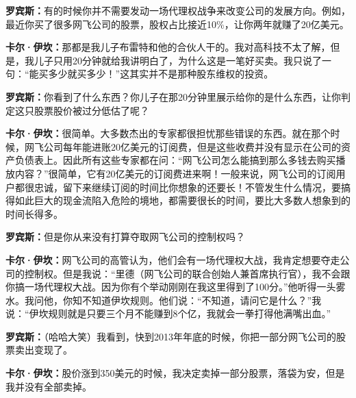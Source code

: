 \begin{BookQuote}
\textbf{罗宾斯：}有的时候你并不需要发动一场代理权战争来改变公司的发展方向。例如，最近你买了很多网飞公司的股票，股权占比接近10\%，让你两年就赚了20亿美元。
\end{BookQuote}

\begin{BookQuote}
\textbf{卡尔·伊坎：}那都是我儿子布雷特和他的合伙人干的。我对高科技不太了解，但是，我儿子只用20分钟就给我讲明白了，为什么这是一笔好买卖。我只说了一句：“能买多少就买多少！”这其实并不是那种股东维权的投资。
\end{BookQuote}

\begin{BookQuote}
\textbf{罗宾斯：}你看到了什么东西？你儿子在那20分钟里展示给你的是什么东西，让你判定这只股票股价被过分低估了呢？
\end{BookQuote}

\begin{BookQuote}
\textbf{卡尔·伊坎：}很简单。大多数杰出的专家都很担忧那些错误的东西。就在那个时候，网飞公司每年能进账20亿美元的订阅费，但是这些收费并没有显示在公司的资产负债表上。因此所有这些专家都在问：“网飞公司怎么能搞到那么多钱去购买播放内容？”很简单，它有20亿美元的订阅费进来啊！一般来说，网飞公司的订阅用户都很忠诚，留下来继续订阅的时间比你想象的还要长！不管发生什么情况，要搞得如此巨大的现金流陷入危险的境地，都需要很长的时间，要比大多数人想象到的时间长得多。
\end{BookQuote}

\begin{BookQuote}
\textbf{罗宾斯：}但是你从来没有打算夺取网飞公司的控制权吗？
\end{BookQuote}

\begin{BookQuote}
\textbf{卡尔·伊坎：}网飞公司的高管认为，他们会有一场代理权大战，我肯定想要夺走公司的控制权。但是我说：“里德（网飞公司的联合创始人兼首席执行官），我不会跟你搞一场代理权大战。因为你有个举动刚刚在我这里得到了100分。”他听得一头雾水。我问他，你知不知道伊坎规则。他们说：“不知道，请问它是什么？”我说：“伊坎规则就是只要三个月不能赚到8个亿，我就会一拳打得他满嘴出血。”
\end{BookQuote}

\begin{BookQuote}
\textbf{罗宾斯：}（哈哈大笑）我看到，快到2013年年底的时候，你把一部分网飞公司的股票卖出变现了。
\end{BookQuote}

\begin{BookQuote}
\textbf{卡尔·伊坎：}股价涨到350美元的时候，我决定卖掉一部分股票，落袋为安，但是我并没有全部卖掉。
\end{BookQuote}

